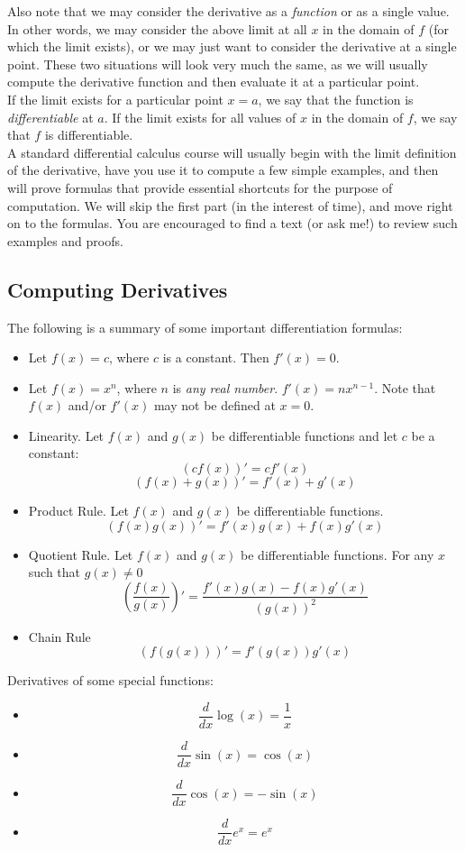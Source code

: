 \documentclass[12pt,a4paper]{article} %
\begin{document}
Also note that we may consider the derivative as a \emph{function} or as a single value. In other words, we may consider the above limit at all $x$ in the domain of $f$ (for which the limit exists), or we may just want to consider the derivative at a single point. These two situations will look very much the same, as we will usually compute the derivative function and then evaluate it at a particular point.\\

If the limit exists for a particular point $x=a$, we say that the function is \emph{differentiable} at $a$. If the limit exists for all values of $x$ in the domain of $f$, we say that $f$ is differentiable.\\

A standard differential calculus course will usually begin with the limit definition of the derivative, have you use it to compute a few simple examples, and then will prove formulas that provide essential shortcuts for the purpose of computation. We will skip the first part (in the interest of time), and move right on to the formulas. You are encouraged to find a text (or ask me!) to review such examples and proofs. 

\subsection{Computing Derivatives}
The following is a summary of some important differentiation formulas:
\begin{itemize}
\item Let $f(x) = c$, where $c$ is a constant. Then $f'(x)=0$.
\item Let $f(x) = x^n$, where $n$ is \emph{any real number}. $f'(x) = nx^{n-1}$. Note that $f(x)$ and/or $f'(x)$ may not be defined at $x=0$.
\item Linearity. Let $f(x)$ and $g(x)$ be differentiable functions and let $c$ be a constant:
$$\left(cf(x)\right)' = cf'(x)$$
$$\left(f(x)+g(x)\right)' = f'(x) + g'(x)$$
\item Product Rule. Let $f(x)$ and $g(x)$ be differentiable functions.
$$\left(f(x)g(x)\right)' = f'(x)g(x) + f(x)g'(x)$$
\item Quotient Rule. Let $f(x)$ and $g(x)$ be differentiable functions. For any $x$ such that $g(x)\neq0$
$$\left(\frac{f(x)}{g(x)}\right)' = \frac{f'(x)g(x)-f(x)g'(x)}{\left(g(x)\right)^2}$$
\item Chain Rule
$$\left(f(g(x))\right)' = f'(g(x))g'(x)$$
\end{itemize}
Derivatives of some special functions:
\begin{itemize}
\item $$\frac{d}{dx}\log(x) = \frac1{x}$$
\item $$\frac{d}{dx}\sin(x) = \cos(x)$$
\item $$\frac{d}{dx}\cos(x) = -\sin(x)$$
\item $$\frac{d}{dx}e^x = e^x$$
\end{itemize}
\end{document}
